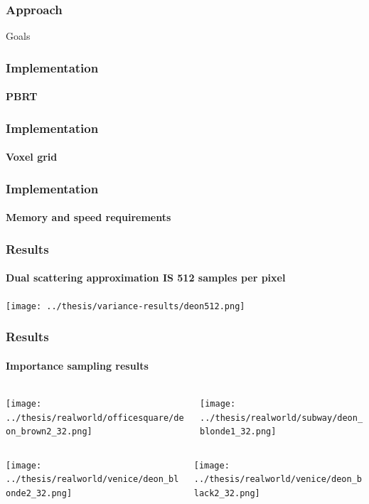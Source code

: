 \documentclass{beamer}
\begin{document}
  
  \begin{frame}
    \frametitle{Approach}
	Goals
  \end{frame}
  
  
  \begin{frame}
    \frametitle{Implementation}
    \framesubtitle{PBRT}
  \end{frame}
  
  \begin{frame}
    \frametitle{Implementation}
    \framesubtitle{Voxel grid}
  \end{frame}
  
  \begin{frame}
    \frametitle{Implementation}
    \framesubtitle{Memory and speed requirements}
  \end{frame}
  
  \begin{frame}
    \frametitle{Results}
    \framesubtitle{Dual scattering approximation IS 512 samples per pixel}
    \centering
	\texttt{[image: ../thesis/variance-results/deon512.png]}    
  \end{frame}
  
  \begin{frame}
    \frametitle{Results}
    \framesubtitle{Importance sampling results}
    \centering
    
    \begin{columns}
    \begin{column}{0.5\textwidth}
    \texttt{[image: ../thesis/realworld/officesquare/deon\_brown2\_32.png]} 
    \end{column}
    \begin{column}{0.5\textwidth}
    \texttt{[image: ../thesis/realworld/subway/deon\_blonde1\_32.png]} 
    \end{column}
    \end{columns}
    
    \begin{columns}
    \begin{column}{0.5\textwidth}
    \texttt{[image: ../thesis/realworld/venice/deon\_blonde2\_32.png]} 
    \end{column}
    \begin{column}{0.5\textwidth}
    \texttt{[image: ../thesis/realworld/venice/deon\_black2\_32.png]} 
    \end{column}
    \end{columns}
       
  \end{frame}
  
\end{document}
